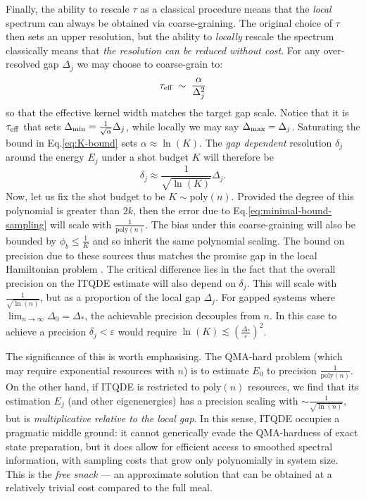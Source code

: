 \documentclass[reprint, aps,prx,showpacs,bibfootnote,preprintnumbers, mathtools, superscriptaddress, amsmath,amssymb]{revtex4-2}
\begin{document}
Finally, the ability to rescale $\tau$ as a classical procedure means that the \textit{local} spectrum can always be obtained via coarse-graining. The original choice of $\tau$ then sets an upper resolution, but the ability to \textit{locally} rescale the spectrum classically means that \textit{the resolution can be reduced without cost}. For any over-resolved gap $\Delta_j$ we may choose to coarse-grain to:
\begin{equation}
\tau_{\rm eff}\;\sim\;\frac{\alpha}{\Delta_j^2}
\end{equation}
so that the effective kernel width matches the target gap scale. Notice that it is $\tau_{\rm eff}$ that sets $\Delta_{\rm min}=\frac{1}{\sqrt{\alpha}}\Delta_j$, while locally we may say  $\Delta_{\rm max}=\Delta_j$. Saturating the bound in Eq.\eqref{eq:K-bound} sets $\alpha \approx \ln(K)$. The \textit{gap dependent} resolution $\delta_j$ around the energy \(E_j\) under a shot budget $K$ will therefore be
\begin{equation}
    \delta_j \approx \frac{1}{\sqrt{\ln(K)}}\Delta_j.
\end{equation}
Now, let us fix the shot budget to be $K\sim \mathrm{poly}(n)$. Provided the degree of this polynomial is greater than $2k$, then the error due to Eq.\eqref{eq:minimal-bound-sampling} will scale with $\frac{1}{\mathrm{poly}(n)}$. The bias under this coarse-graining will also be bounded by $\phi_b \le \frac{1}{K}$ and so inherit the same polynomial scaling. The bound on precision due to these sources thus matches the promise gap in the local Hamiltonian problem \cite{kitaev_classical_2002}. The critical difference lies in the fact that the overall precision on the ITQDE estimate will also depend on $\delta_j$. This will scale with $\frac{1}{\sqrt{\ln(n)}}$, but as a proportion of the local gap $\Delta_j$. For gapped systems where $\lim_{n\to \infty}\Delta_0=\Delta_*$, the achievable precision decouples from $n$. In this case to achieve a precision $\delta_j < \varepsilon$ would require $\ln(K)\lesssim (\frac{\Delta_*}{\varepsilon})^2$.

The significance of this is worth emphasising. The QMA-hard problem (which may require exponential resources with $n$) is to estimate $E_0$ to precision $\frac{1}{\mathrm{poly}(n)}$. On the other hand, if ITQDE is restricted to $\mathrm{poly}(n)$ resources, we find that its estimation $E_j$ (and other eigenenergies) has a precision scaling with $\sim\frac{1}{\sqrt{\ln(n)}}$, but is \textit{multiplicative relative to the local gap}. In this sense, ITQDE occupies a pragmatic middle ground: it cannot generically evade the QMA-hardness of exact state preparation, but it does allow for efficient access to smoothed spectral information, with sampling costs that grow only polynomially in system size. This is the \textit{free snack} — an approximate solution that can be obtained at a relatively trivial cost compared to the full meal.
\end{document}
